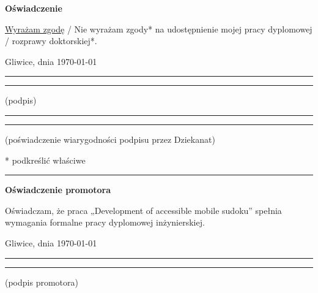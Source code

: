 \documentclass[a4paper,twoside,12pt]{book}
\newcommand{\Title}{Development of accessible mobile sudoku}
\begin{document}
\begin{center}
\Large\bfseries Oświadczenie
\end{center}

\vfill

\underline{Wyrażam  zgodę} / Nie wyrażam zgody*  na  udostępnienie  mojej  pracy  dyplomowej / rozprawy doktorskiej*.

\vfill

Gliwice, dnia {\today}

\vfill

\rule{0.5\textwidth}{0cm}\dotfill 

\rule{0.5\textwidth}{0cm}
\begin{minipage}{0.45\textwidth}
{\begin{center}(podpis)\end{center}}
\end{minipage} 

\vfill

\rule{0.5\textwidth}{0cm}\dotfill 

\rule{0.5\textwidth}{0cm}
\begin{minipage}{0.45\textwidth}
{\begin{center}\rule{0mm}{5mm}(poświadczenie wiarygodności podpisu przez Dziekanat)\end{center}}
\end{minipage}


\vfill

* podkreślić właściwe

 


\cleardoublepage

\rule{1cm}{0cm}

\vfill  

\begin{center}
\Large\bfseries Oświadczenie promotora
\end{center}

\vfill

Oświadczam, że praca „\Title” spełnia wymagania formalne pracy dyplomowej inżynierskiej.

\vfill



\vfill

Gliwice, dnia {\today}

\rule{0.5\textwidth}{0cm}\dotfill 

\rule{0.5\textwidth}{0cm}
\begin{minipage}{0.45\textwidth}
{\begin{center}(podpis promotora)\end{center}}
\end{minipage} 
\end{document}
